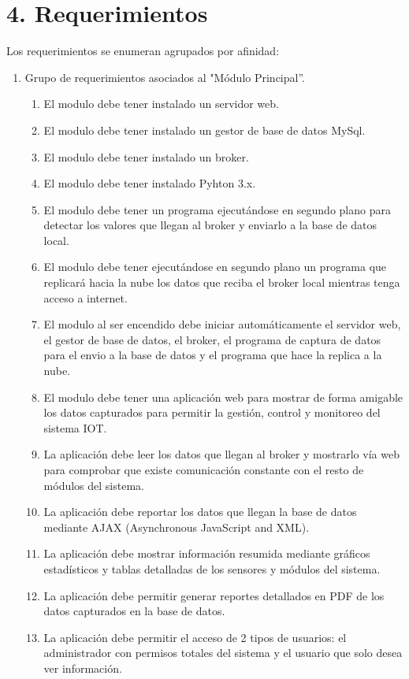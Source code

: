 \documentclass[11pt]{charter}
\begin{document}
\section{4. Requerimientos}
\label{sec:requerimientos}

Los requerimientos se enumeran agrupados por afinidad:

\begin{enumerate}
\item Grupo de requerimientos asociados al "Módulo Principal''.
	\begin{enumerate}
	\item El modulo debe tener instalado un servidor web.
	\item El modulo debe tener instalado un gestor de base de datos MySql.
	\item El modulo debe tener instalado un broker.
	\item El modulo debe tener instalado Pyhton 3.x.
	\item El modulo debe tener un programa ejecutándose en segundo plano para detectar los valores que llegan al broker y enviarlo a la base de datos local.
	\item El modulo debe tener ejecutándose en segundo plano un programa que replicará hacia la nube los datos que reciba el broker local mientras tenga acceso a internet.
	\item El modulo al ser encendido debe iniciar automáticamente el servidor web, el gestor de base de datos, el broker, el programa de captura de datos para el envio a la base de datos y el programa que hace la replica a la nube.
	\item El modulo debe tener una aplicación web para mostrar de forma amigable los datos capturados para permitir la gestión, control y monitoreo del sistema IOT.
	\item La aplicación debe leer los datos que llegan al broker y mostrarlo vía web para comprobar que existe comunicación constante con el resto de módulos del sistema.
	\item La aplicación debe reportar los datos que llegan la base de datos mediante AJAX (Asynchronous JavaScript and XML).
	\item La aplicación debe mostrar información resumida mediante gráficos estadísticos y tablas detalladas de los sensores y módulos del sistema.
	\item La aplicación debe permitir generar reportes detallados en PDF de los datos capturados en la base de datos.
	\item La aplicación debe permitir el acceso de 2 tipos de usuarios: el administrador con permisos totales del sistema y el usuario que solo desea ver información.

\end{enumerate}
\end{enumerate}
\end{document}
